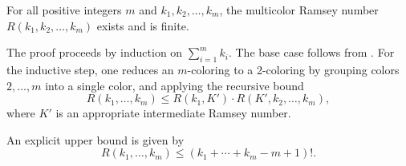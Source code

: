 \begin{theorem} \label{theorem:finite_ramseys_theorem_existence_of_multicolor_ramsey_numbers}
For all positive integers $m$ and $k_1, k_2, \dots, k_m$, the multicolor Ramsey number $R(k_1, k_2, \dots, k_m)$ exists and is finite.

The proof proceeds by induction on $\sum_{i=1}^m k_i$. The base case follows from . For the inductive step, one reduces an $m$-coloring to a 2-coloring by grouping colors $2,\dots,m$ into a single color, and applying the recursive bound
$$R(k_1, \dots, k_m) \leq R(k_1, K') \cdot R(K', k_2, \dots, k_m),$$
where $K'$ is an appropriate intermediate Ramsey number.

An explicit upper bound is given by
$$R(k_1, \dots, k_m) \leq (k_1 + \cdots + k_m - m + 1)!.$$
\end{theorem}
